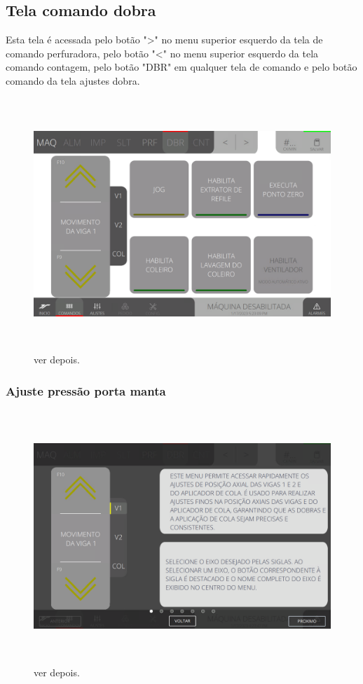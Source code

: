 \thispagestyle{fancy}
\vspace*{\fill}
\subsection{Tela comando dobra}
 Esta tela é acessada pelo botão "\textgreater" no menu superior esquerdo da tela de comando perfuradora, pelo botão "\textless{}" no menu superior esquerdo da tela comando contagem, pelo botão "DBR" em qualquer tela de comando e pelo botão comando da tela ajustes dobra.
\begin{figure}[h]
  \centering
  \includegraphics[width=576px,height=360px]{src/images/07-fold/commands/e-Tela-Principal.png}
  \caption{ver depois.}
   \label{}
\end{figure}

\newpage
\thispagestyle{fancy}
\vspace*{\fill}
\subsubsection{\small{Ajuste pressão porta manta}}
\begin{figure}[h]
  \centering
  \includegraphics[width=576px,height=360px]{src/images/07-fold/commands/e-1.png}
  \caption{ver depois.}
   \label{}
\end{figure}
\vspace*{\fill}

